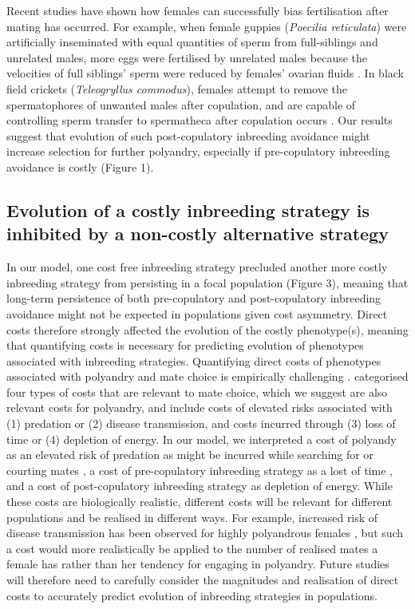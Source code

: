 \documentclass[10pt,letterpaper]{article}
\begin{document}
Recent studies have shown how females can successfully bias fertilisation after mating has occurred. For example, when female guppies (\textit{Poecilia reticulata}) were artificially inseminated with equal quantities of sperm from full-siblings and unrelated males, more eggs were fertilised by unrelated males because the velocities of full siblings' sperm were reduced by females' ovarian fluids \cite[][]{Gasparini2011}. In black field crickets (\textit{Teleogryllus commodus}), females attempt to remove the spermatophores of unwanted males after copulation, and are capable of controlling sperm transfer to spermatheca after copulation occurs \cite[][]{Bussiere2006, Tuni2013}. Our results suggest that evolution of such post-copulatory inbreeding avoidance might increase selection for further polyandry, especially if pre-copulatory inbreeding avoidance is costly (Figure 1).

\subsection*{Evolution of a costly inbreeding strategy is inhibited by a non-costly alternative strategy}

In our model, one cost free inbreeding strategy precluded another more costly inbreeding strategy from persisting in a focal population (Figure 3), meaning that long-term persistence of both pre-copulatory and post-copulatory inbreeding avoidance might not be expected in populations given cost asymmetry. Direct costs therefore strongly affected the evolution of the costly phenotype(s), meaning that quantifying costs is necessary for predicting evolution of phenotypes associated with inbreeding strategies. Quantifying direct costs of phenotypes associated with polyandry and mate choice is empirically challenging \cite[][]{Pomiankowski1987, Kokko2003, Reid2015}. \cite{Pomiankowski1987} categorised four types of costs that are relevant to mate choice, which we suggest are also relevant costs for polyandry, and include costs of elevated risks associated with (1) predation or (2) disease transmission, and costs incurred through (3) loss of time or (4) depletion of energy. In our model, we interpreted a cost of polyandy as an elevated risk of predation as might be incurred while searching for or courting mates \cite[e.g.,][]{Rowe1988, Rowe1994}, a cost of pre-copulatory inbreeding strategy as a lost of time \cite[i.e., risk of not finding a mate in time due to choosiness; e.g.,][]{Kokko2013}, and a cost of post-copulatory inbreeding strategy as depletion of energy. While these costs are biologically realistic, different costs will be relevant for different populations and be realised in different ways. For example, increased risk of disease transmission has been observed for highly polyandrous females \cite[][]{Roberts2015a}, but such a cost would more realistically be applied to the number of realised mates a female has rather than her tendency for engaging in polyandry. Future studies will therefore need to carefully consider the magnitudes and realisation of direct costs to accurately predict evolution of inbreeding strategies in populations. 
\end{document}

